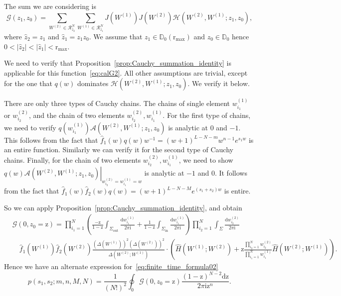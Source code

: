\documentclass{article}
\numberwithin{equation}{section}
\newcommand{\ddbar}[2]{\frac{{\mathrm d}#1}{2\pi {\mathrm i}#2}}
\newcommand{\inn}{\mathrm{in}}
\newcommand{\out}{\mathrm{out}}
\newcommand{\rr}{\mathrm{r_{max}}}
\newcommand{\rz}{\mathrm{z}}
\begin{document}
The sum we are considering is
\begin{equation}
	\label{eq:calG2}
	\mathcal{G}(z_1,z_0) = \sum_{W^{(2)}\in \mathcal{R}_{\hat z_2}^N} \sum_{W^{(1)} \in \mathcal{R}_{\hat z_1}^{N}} J\left(W^{(1)}\right)J\left(W^{(2)}\right) \mathcal{H}\left(W^{(2)},W^{(1)};z_1,z_0\right),
\end{equation}
where $\hat z_2=z_1$ and $\hat z_1=z_1z_0$. We assume that $z_1\in\mathbb{D}_0(\rr)$ and $z_0\in\mathbb{D}_0$ hence $0<|\hat z_2|< |\hat z_1|<\rr$.

We need to verify that Proposition~\ref{prop:Cauchy_summation_identity} is applicable for this function~\eqref{eq:calG2}. All other assumptions are trivial, except for the one that $q(w)$ dominates $\mathcal{H} \left(W^{(2)},W^{(1)};z_1,z_0\right)$. We verify it below.

There are only three types of Cauchy chains. The chains of single element $w_{i_1}^{(1)}$ or $w_{i_2}^{(2)}$, and the chain of two elements $w_{i_2}^{(2)}, w_{i_1}^{(1)}$. For the first type of chains, we need to verify $q(w_{i_1}^{(1)})\mathcal{A} \left(W^{(2)},W^{(1)};z_1,z_0\right)$ is analytic at $0$ and $-1$. This follows from the fact that $\hat f_1(w)q(w)w^{-1}=(w+1)^{L-N-m}w^{n-1}e^{s_1w}$ is an entire function. Similarly we can verify it for the second type of Cauchy chains. Finally, for the chain of two elements $w_{i_2}^{(2)},w_{i_1}^{(1)}$, we need to show $\left.q(w)\mathcal{A} \left(W^{(2)},W^{(1)};z_1,z_0\right)\right|_{w_{i_2}^{(2)}=w_{i_1}^{(1)}=w}$ is analytic at $-1$ and $0$. It follows from the fact that $\hat f_1(w)\hat f_2(w)q(w)=(w+1)^{L-N-M}e^{(s_1+s_2)w}$ is entire.


So we can apply Proposition~\ref{prop:Cauchy_summation_identity}, and obtain
\begin{equation*}
	\begin{split}
	&\mathcal{G}(0,z_0=\rz)=\prod_{i_1=1}^N \left(
	\frac{-\rz}{1-\rz} \int_{\Sigma_{\out}}
	\ddbar{w_{i_1}^{(1)}}{}
	+\frac{1}{1-\rz}  \int_{\Sigma_{\inn}}
	\ddbar{w_{i_1}^{(1)}}{}
	\right)
	\prod_{i_2=1}^N \int_{\Sigma} \ddbar{w_{i_2}^{(2)}}{}\\
	&\quad 
	\hat f_1\left(W^{(1)}\right)
	\hat f_2\left(W^{(2)}\right)
	\frac{ \left( \Delta\left(W^{(1)}\right) \right)^2 
		\left( \Delta\left(W^{(2)}\right) \right)^2
	}
	{ \Delta\left(W^{(2)};W^{(1)}\right)
	}
	\cdot 
	\left(
	\hat H \left(W^{(1)};W^{(2)}\right)
	+ \rz \frac{\prod_{i_2=1}^N w_{i_2}^{(2)}}
	{\prod_{i_1=1}^N w_{i_1}^{(1)}}
	\hat H \left(W^{(2)}; W^{(1)}\right)
	\right).
	\end{split}
\end{equation*}
Hence we have an alternate expression for~\eqref{eq:finite_time_formula02}
\begin{equation}
	\label{eq:aux_09}
	p(s_1,s_2;m,n,M,N)=\frac{1}{(N!)^2}\oint_0 \mathcal{G}(0,z_0=\rz) \frac{ (1-\rz)^{N-2} \mathrm{d}\rz }
	{ 2\pi\mathrm{i} \rz^n }.
\end{equation}
\end{document}
